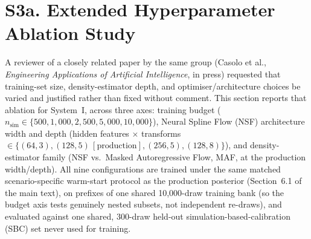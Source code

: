 \documentclass[aps,pre,twocolumn,superscriptaddress]{revtex4-2}
\begin{document}
\section*{S3a.\; Extended Hyperparameter Ablation Study}
\label{sec:si_ablation}

A reviewer of a closely related paper by the same group (Casolo et al.,
\emph{Engineering Applications of Artificial Intelligence}, in press) requested that
training-set size, density-estimator depth, and optimiser/architecture choices be
varied and justified rather than fixed without comment. This section reports that
ablation for System~I, across three axes: training budget ($n_\mathrm{sim}\in\{500,
1{,}000, 2{,}500, 5{,}000, 10{,}000\}$), Neural Spline Flow (NSF) architecture width
and depth (hidden features $\times$ transforms $\in\{(64,3),(128,5)\,[\mathrm{production}],
(256,5),(128,8)\}$), and density-estimator family (NSF vs.\ Masked Autoregressive
Flow, MAF, at the production width/depth). All nine configurations are trained under
the same matched scenario-specific warm-start protocol as the production posterior
(Section~6.1 of the main text), on prefixes of one shared 10,000-draw training bank
(so the budget axis tests genuinely nested subsets, not independent re-draws), and
evaluated against one shared, 300-draw held-out simulation-based-calibration (SBC)
set never used for training.
\end{document}
